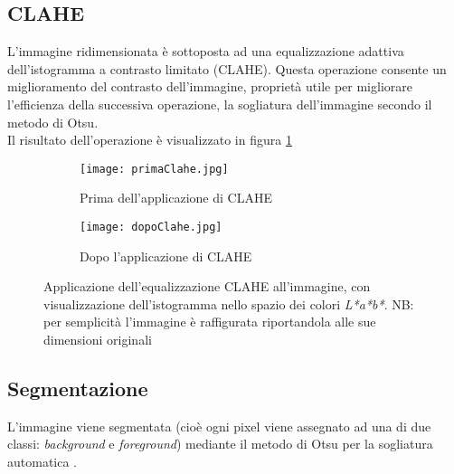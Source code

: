 \subsection*{CLAHE}
L'immagine ridimensionata è sottoposta ad una equalizzazione adattiva dell’istogramma a contrasto limitato (CLAHE). Questa operazione consente un miglioramento del contrasto dell'immagine, proprietà utile per migliorare l'efficienza della successiva operazione, la sogliatura dell'immagine secondo il metodo di Otsu.\\

\noindent Il risultato dell'operazione è visualizzato in figura \ref{fig:clahe}

\begin{figure}[h]

  \centering
  
  \begin{subfigure}[b]{0.42\textwidth}
    \texttt{[image: primaClahe.jpg]}
    \caption{Prima dell'applicazione di CLAHE}
  \end{subfigure}
  \begin{subfigure}[b]{0.42\textwidth}
  \centering
    \texttt{[image: dopoClahe.jpg]}
    \caption{Dopo l'applicazione di CLAHE}
  \end{subfigure}
  
  \caption{Applicazione dell'equalizzazione CLAHE all'immagine, con visualizzazione dell'istogramma nello spazio dei colori \textit{L*a*b*}. NB: per semplicità l'immagine è raffigurata riportandola alle sue dimensioni originali}
  \label{fig:clahe}
\end{figure}

\subsection*{Segmentazione}
L'immagine viene segmentata (cioè ogni pixel viene assegnato ad una di due classi: \textit{background} e \textit{foreground}) mediante il metodo di Otsu per la sogliatura automatica \cite{otsu}.


